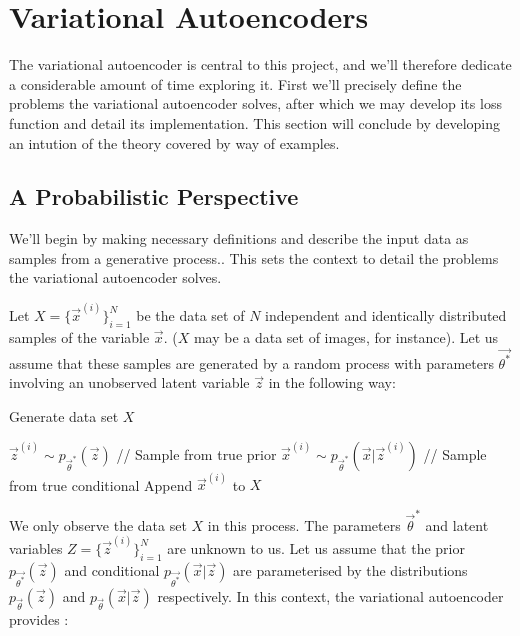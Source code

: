 %
%
%
%
%
\section{Variational Autoencoders}
\cite{Kingma2014}

The variational autoencoder is central to this project, and we'll therefore dedicate a considerable amount of time exploring it. First we'll precisely define the problems the variational autoencoder solves, after which we may develop its loss function and detail its implementation. This section will conclude by developing an intution of the theory covered by way of examples.

\subsection{A Probabilistic Perspective}
We'll begin by making necessary definitions and describe the input data as samples from a generative process.. This sets the context to detail the problems the variational autoencoder solves.

Let $X = \{\vec{x}^{(i)}\}_{i=1}^{N}$ be the data set of $N$ independent and identically distributed samples of the variable $\vec{x}$. ($X$ may be a data set of images, for instance). Let us assume that these samples are generated by a random process with parameters $\vec{\theta^*}$ involving an unobserved latent variable $\vec{z}$ in the following way:\\

\begin{algorithm}
  \caption{Generate data set $X$}
  \begin{algorithmic}[1]
      \State $\vec{z}^{(i)} \sim p_{\vec{\theta}^*}(\vec{z})$ \quad\quad\quad\quad\quad\quad\quad\quad\quad\quad // Sample from true prior
      \State $\vec{x}^{(i)} \sim p_{\vec{\theta}^*}(\vec{x} | \vec{z}^{(i)})$ \quad\quad\quad\quad\quad\quad\quad\enspace\enspace\thinspace // Sample from true conditional
      \State Append $\vec{x}^{(i)}$ to $X$
  \EndFor
  \end{algorithmic}
  \label{alg:generate_data_set_x}
\end{algorithm}

We only observe the data set $X$ in this process. The parameters $\vec{\theta}^*$ and latent variables $Z = \{ \vec{z}^{(i)} \}_{i=1}^{N}$ are unknown to us. Let us assume that the prior $p_{\vec{\theta^*}}(\vec{z})$ and conditional $p_{\vec{\theta^*}}(\vec{x}|\vec{z})$ are parameterised by the distributions $p_{\vec{\theta}}(\vec{z})$ and $p_{\vec{\theta}}(\vec{x}|\vec{z})$ respectively. In this context, the variational autoencoder provides \cite{Kingma2014}:

